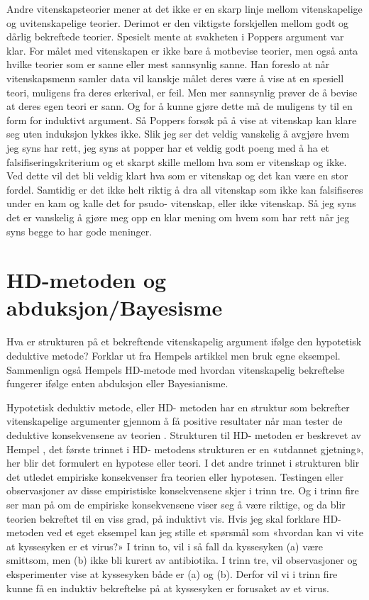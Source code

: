 \documentclass[
]{book}
\begin{document}
Andre vitenskapsteorier mener at det ikke er en skarp linje mellom vitenskapelige og uvitenskapelige teorier.
Derimot er den viktigste forskjellen mellom godt og dårlig bekreftede teorier.
Spesielt \citet{okasha2016} mente at svakheten i Poppers argument var klar.
For målet med vitenskapen er ikke bare å motbevise teorier, men også anta hvilke teorier som er sanne eller mest sannsynlig sanne.
Han foreslo at når vitenskapsmenn samler data vil kanskje målet deres være å vise at en spesiell teori, muligens fra deres erkerival, er feil.
Men mer sannsynlig prøver de å bevise at deres egen teori er sann.
Og for å kunne gjøre dette må de muligens ty til en form for induktivt argument.
Så Poppers forsøk på å vise at vitenskap kan klare seg uten induksjon lykkes ikke.
Slik jeg ser det veldig vanskelig å avgjøre hvem jeg syns har rett, jeg syns at popper har et veldig godt poeng med å ha et falsifiseringskriterium og et skarpt skille mellom hva som er vitenskap og ikke.
Ved dette vil det bli veldig klart hva som er vitenskap og det kan være en stor fordel.
Samtidig er det ikke helt riktig å dra all vitenskap som ikke kan falsifiseres under en kam og kalle det for psudo- vitenskap, eller ikke vitenskap.
Så jeg syns det er vanskelig å gjøre meg opp en klar mening om hvem som har rett når jeg syns begge to har gode meninger.

\hypertarget{hd-metoden-og-abduksjonbayesisme}{%
\section{HD-metoden og abduksjon/Bayesisme}\label{hd-metoden-og-abduksjonbayesisme}}

Hva er strukturen på et bekreftende vitenskapelig argument ifølge den hypotetisk deduktive metode?
Forklar ut fra Hempels artikkel men bruk egne eksempel.
Sammenlign også Hempels HD-metode med hvordan vitenskapelig bekreftelse fungerer ifølge enten abduksjon eller Bayesianisme.

Hypotetisk deduktiv metode, eller HD- metoden har en struktur som bekrefter vitenskapelige argumenter gjennom å få positive resultater når man tester de deduktive konsekvensene av teorien \citet{hempel1966}.
Strukturen til HD- metoden er beskrevet av Hempel \citet{hempel1966}, det første trinnet i HD- metodens strukturen er en «utdannet gjetning», her blir det formulert en hypotese eller teori.
I det andre trinnet i strukturen blir det utledet empiriske konsekvenser fra teorien eller hypotesen.
Testingen eller observasjoner av disse empiristiske konsekvensene skjer i trinn tre.
Og i trinn fire ser man på om de empiriske konsekvensene viser seg å være riktige, og da blir teorien bekreftet til en viss grad, på induktivt vis.
Hvis jeg skal forklare HD- metoden ved et eget eksempel kan jeg stille et spørsmål som «hvordan kan vi vite at kyssesyken er et virus?»
I trinn to, vil i så fall da kyssesyken (a) være smittsom, men (b) ikke bli kurert av antibiotika.
I trinn tre, vil observasjoner og eksperimenter vise at kyssesyken både er (a) og (b).
Derfor vil vi i trinn fire kunne få en induktiv bekreftelse på at kyssesyken er forusaket av et virus.
\end{document}

